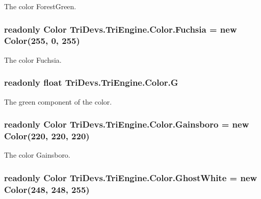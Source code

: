 The color Forest\-Green. 

\hypertarget{struct_tri_devs_1_1_tri_engine_1_1_color_afd4ba1d396778a11f5928f86d4ae13a2}{
\subsubsection[{Fuchsia}]{\setlength{\rightskip}{0pt plus 5cm}readonly {\bf Color} Tri\-Devs.\-Tri\-Engine.\-Color.\-Fuchsia = new {\bf Color}(255, 0, 255)\hspace{0.3cm}{\ttfamily [static]}}}\label{struct_tri_devs_1_1_tri_engine_1_1_color_afd4ba1d396778a11f5928f86d4ae13a2}


The color Fuchsia. 

\hypertarget{struct_tri_devs_1_1_tri_engine_1_1_color_ac07b8afa44f3087b0f4db3a46198f9eb}{
\subsubsection[{G}]{\setlength{\rightskip}{0pt plus 5cm}readonly float Tri\-Devs.\-Tri\-Engine.\-Color.\-G}}\label{struct_tri_devs_1_1_tri_engine_1_1_color_ac07b8afa44f3087b0f4db3a46198f9eb}


The green component of the color. 

\hypertarget{struct_tri_devs_1_1_tri_engine_1_1_color_a5b8e9c24446b08dd7738fd12b954cbd7}{
\subsubsection[{Gainsboro}]{\setlength{\rightskip}{0pt plus 5cm}readonly {\bf Color} Tri\-Devs.\-Tri\-Engine.\-Color.\-Gainsboro = new {\bf Color}(220, 220, 220)\hspace{0.3cm}{\ttfamily [static]}}}\label{struct_tri_devs_1_1_tri_engine_1_1_color_a5b8e9c24446b08dd7738fd12b954cbd7}


The color Gainsboro. 

\hypertarget{struct_tri_devs_1_1_tri_engine_1_1_color_aac1e110a73873605a6fe2da1c0d64187}{
\subsubsection[{Ghost\-White}]{\setlength{\rightskip}{0pt plus 5cm}readonly {\bf Color} Tri\-Devs.\-Tri\-Engine.\-Color.\-Ghost\-White = new {\bf Color}(248, 248, 255)\hspace{0.3cm}{\ttfamily [static]}}}\label{struct_tri_devs_1_1_tri_engine_1_1_color_aac1e110a73873605a6fe2da1c0d64187}


